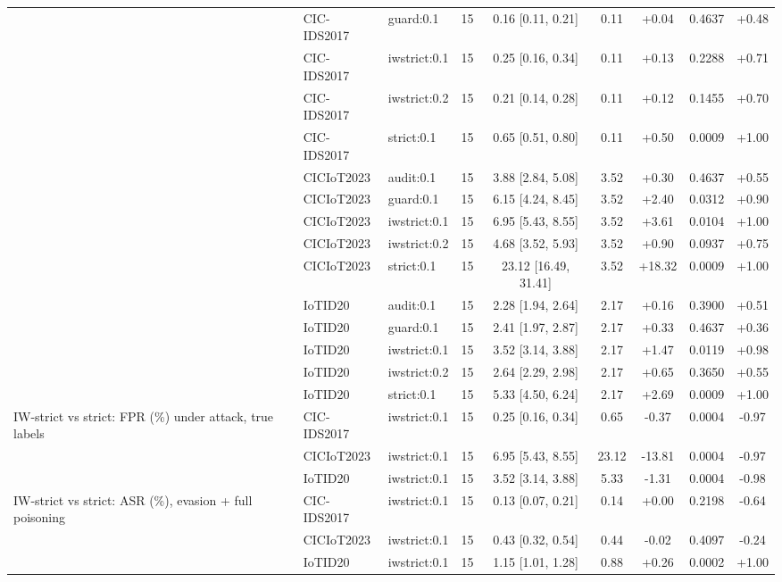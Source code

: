 \begin{table}[t]
\begin{tabular}{lllcccccc}
 & CIC-IDS2017 & guard:0.1 & 15 & 0.16 [0.11, 0.21] & 0.11 & +0.04 & 0.4637 & +0.48 \\
 & CIC-IDS2017 & iwstrict:0.1 & 15 & 0.25 [0.16, 0.34] & 0.11 & +0.13 & 0.2288 & +0.71 \\
 & CIC-IDS2017 & iwstrict:0.2 & 15 & 0.21 [0.14, 0.28] & 0.11 & +0.12 & 0.1455 & +0.70 \\
 & CIC-IDS2017 & strict:0.1 & 15 & 0.65 [0.51, 0.80] & 0.11 & +0.50 & 0.0009 & +1.00 \\
 & CICIoT2023 & audit:0.1 & 15 & 3.88 [2.84, 5.08] & 3.52 & +0.30 & 0.4637 & +0.55 \\
 & CICIoT2023 & guard:0.1 & 15 & 6.15 [4.24, 8.45] & 3.52 & +2.40 & 0.0312 & +0.90 \\
 & CICIoT2023 & iwstrict:0.1 & 15 & 6.95 [5.43, 8.55] & 3.52 & +3.61 & 0.0104 & +1.00 \\
 & CICIoT2023 & iwstrict:0.2 & 15 & 4.68 [3.52, 5.93] & 3.52 & +0.90 & 0.0937 & +0.75 \\
 & CICIoT2023 & strict:0.1 & 15 & 23.12 [16.49, 31.41] & 3.52 & +18.32 & 0.0009 & +1.00 \\
 & IoTID20 & audit:0.1 & 15 & 2.28 [1.94, 2.64] & 2.17 & +0.16 & 0.3900 & +0.51 \\
 & IoTID20 & guard:0.1 & 15 & 2.41 [1.97, 2.87] & 2.17 & +0.33 & 0.4637 & +0.36 \\
 & IoTID20 & iwstrict:0.1 & 15 & 3.52 [3.14, 3.88] & 2.17 & +1.47 & 0.0119 & +0.98 \\
 & IoTID20 & iwstrict:0.2 & 15 & 2.64 [2.29, 2.98] & 2.17 & +0.65 & 0.3650 & +0.55 \\
 & IoTID20 & strict:0.1 & 15 & 5.33 [4.50, 6.24] & 2.17 & +2.69 & 0.0009 & +1.00 \\
IW-strict vs strict: FPR (\%) under attack, true labels & CIC-IDS2017 & iwstrict:0.1 & 15 & 0.25 [0.16, 0.34] & 0.65 & -0.37 & 0.0004 & -0.97 \\
 & CICIoT2023 & iwstrict:0.1 & 15 & 6.95 [5.43, 8.55] & 23.12 & -13.81 & 0.0004 & -0.97 \\
 & IoTID20 & iwstrict:0.1 & 15 & 3.52 [3.14, 3.88] & 5.33 & -1.31 & 0.0004 & -0.98 \\
IW-strict vs strict: ASR (\%), evasion + full poisoning & CIC-IDS2017 & iwstrict:0.1 & 15 & 0.13 [0.07, 0.21] & 0.14 & +0.00 & 0.2198 & -0.64 \\
 & CICIoT2023 & iwstrict:0.1 & 15 & 0.43 [0.32, 0.54] & 0.44 & -0.02 & 0.4097 & -0.24 \\
 & IoTID20 & iwstrict:0.1 & 15 & 1.15 [1.01, 1.28] & 0.88 & +0.26 & 0.0002 & +1.00 \\
\bottomrule
\end{tabular}
\end{table}
